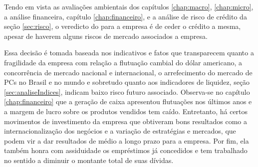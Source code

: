 Tendo em vista as avaliações ambientais dos capítulos \ref{chap:macro}, \ref{chap:micro}, a análise financeira, capítulo \ref{chap:financeiro}, e a análise de risco de crédito da seção \ref{sec:risco}, o veredicto do \nomeDoBanco{} para a empresa \nomeCompletoPositivo{} é de ceder o crédito a mesma, apesar de haverem alguns riscos de mercado associados a empresa.

Essa decisão é tomada baseada nos indicativos e fatos que transparecem quanto a fragilidade da empresa \nomePositivo{} com relação a flutuação cambial do dólar americano, a concorrência de mercado nacional e internacional, o arrefecimento do mercado de PCs no Brasil e no mundo e sobretudo quanto aos indicadores de liquidez, seção \ref{sec:analiseIndices}, indicam baixo risco futuro associado. Observa-se no capítulo \ref{chap:financeiro} que a geração de caixa apresentou flutuações nos últimos anos e a margem de lucro sobre os produtos vendidos tem caído. Entretanto, há certos movimentos de investimento da empresa que obtiveram bons resultados como a internacionalização dos negócios e a variação de estratégias e mercados, que podem vir a dar resultados de médio a longo prazo para a empresa. Por fim, ela também honra com assiduidade os empréstimos já concedidos e tem trabalhado no sentido a diminuir o montante total de suas dívidas.
